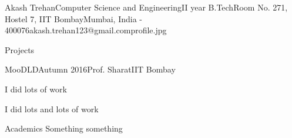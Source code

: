 \documentclass{resume_ssl}
\begin{document}
\begin{Header}{Akash Trehan}{Computer Science and Engineering}{II year B.Tech}{Room No. 271, Hostel 7, IIT Bombay}{Mumbai, India - 400076}{akash.trehan123@gmail.com}{profile.jpg}
\end{Header}

\begin{Section}{Projects}
\begin{Subsection}{MooDLD}{Autumn 2016}{Prof. Sharat}{IIT Bombay}
{
    \item I did lots of work
    \item I did lots and lots of work
}
\end{Subsection}
\end{Section}

\begin{Section}{Academics}
Something something
\end{Section}
\end{document}
